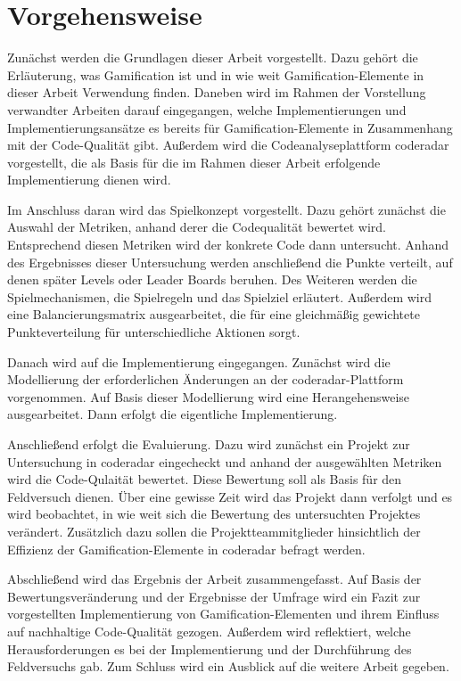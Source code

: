 \documentclass[fontsize=11pt, paper=a4, parskip=half]{scrartcl}
\begin{document}
\section{Vorgehensweise}
Zunächst werden die Grundlagen dieser Arbeit vorgestellt.
Dazu gehört die Erläuterung, was Gamification ist und in wie weit Gamification-Elemente in dieser Arbeit Verwendung finden.
Daneben wird im Rahmen der Vorstellung verwandter Arbeiten darauf eingegangen, welche Implementierungen und Implementierungsansätze es bereits für Gamification-Elemente in Zusammenhang mit der Code-Qualität gibt.
Außerdem wird die Codeanalyseplattform coderadar vorgestellt, die als Basis für die im Rahmen dieser Arbeit erfolgende Implementierung dienen wird.

Im Anschluss daran wird das Spielkonzept vorgestellt.
Dazu gehört zunächst die Auswahl der Metriken, anhand derer die Codequalität bewertet wird.
Entsprechend diesen Metriken wird der konkrete Code dann untersucht.
Anhand des Ergebnisses dieser Untersuchung werden anschließend die Punkte verteilt, auf denen später Levels oder Leader Boards beruhen.
Des Weiteren werden die Spielmechanismen, die Spielregeln und das Spielziel erläutert.
Außerdem wird eine Balancierungsmatrix ausgearbeitet, die für eine gleichmäßig gewichtete Punkteverteilung für unterschiedliche Aktionen sorgt.

Danach wird auf die Implementierung eingegangen.
Zunächst wird die Modellierung der erforderlichen Änderungen an der coderadar-Plattform vorgenommen.
Auf Basis dieser Modellierung wird eine Herangehensweise ausgearbeitet.
Dann erfolgt die eigentliche Implementierung.

Anschließend erfolgt die Evaluierung.
Dazu wird zunächst ein Projekt zur Untersuchung in coderadar eingecheckt und anhand der ausgewählten Metriken wird die Code-Qulaität bewertet.
Diese Bewertung soll als Basis für den Feldversuch dienen.
Über eine gewisse Zeit wird das Projekt dann verfolgt und es wird beobachtet, in wie weit sich die Bewertung des untersuchten Projektes verändert.
Zusätzlich dazu sollen die Projektteammitglieder hinsichtlich der Effizienz der Gamification-Elemente in coderadar befragt werden.

Abschließend wird das Ergebnis der Arbeit zusammengefasst.
Auf Basis der Bewertungsveränderung und der Ergebnisse der Umfrage wird ein Fazit zur vorgestellten Implementierung von Gamification-Elementen und ihrem Einfluss auf nachhaltige Code-Qualität gezogen.
Außerdem wird reflektiert, welche Herausforderungen es bei der Implementierung und der Durchführung des Feldversuchs gab.
Zum Schluss wird ein Ausblick auf die weitere Arbeit gegeben.

\pagebreak



\end{document}
